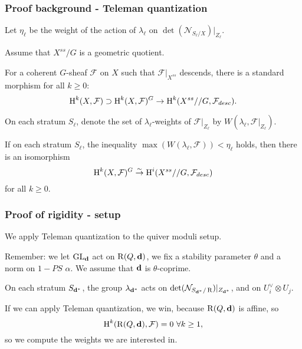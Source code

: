 \documentclass{beamer}
\begin{document}
\begin{frame}
    \frametitle{Proof background - Teleman quantization}
Let $\eta_{\ell}$ be the weight of the action of $\lambda_{\ell}$ on
$\det(\mathcal{N}_{S_{\ell}/X})|_{Z_{\ell}}$. \pause

Assume that $X^{ss}/G$ is a geometric quotient. \pause

For a coherent $G$-sheaf $\mathcal{F}$ on $X$ 
such that $\mathcal{F}|_{X^{ss}}$ descends,
there is a standard morphism for all $k \geq 0$:
\[ \HH^k(X, \mathcal{F}) \supset \HH^{k}(X, \mathcal{F})^{G} \to \HH^{k}(X^{ss} // G, \mathcal{F}_{desc}).\] \pause

On each stratum $S_{\ell}$,
denote the set of $\lambda_{\ell}$-weights of $\mathcal{F}|_{Z_\ell}$
by $W(\lambda_{\ell}, \mathcal{F}|_{Z_\ell})$. \pause
\begin{theorem}

If on each stratum $S_{\ell}$, the inequality $\max(W(\lambda_{\ell}, \mathcal{F})) < \eta_{\ell}$
holds, then there is an isomorphism
\[\HH^{k}(X, \mathcal{F})^{G} \to[\sim] \HH^{i}(X^{ss} // G, \mathcal{F}_{desc})\]
for all $k \geq 0$.
\end{theorem}

\end{frame}

\begin{frame}
    \frametitle{Proof of rigidity - setup}
We apply Teleman quantization to the quiver moduli setup. \pause

Remember: we let $\group$ act on $\parameterspace(Q, \tuple{d})$,
we fix a stability parameter $\theta$ and a norm on $1-PS$ $\alpha$. \pause
We assume that $\tuple{d}$ is $\theta$-coprime.

On each stratum $S_{\tuple{d}^*}$, the group $\lambda_{\tuple{d}^*}$
acts on $\det(\mathcal{N}_{S_{\tuple{d}^*}/\parameterspace})|_{Z_{\tuple{d}^*}}$, \pause
and on ${U}^{\vee}_i \otimes {U}_j$. \pause

If we can apply Teleman quantization, we win, because $\parameterspace(Q, \tuple{d})$ is affine, so
\[\HH^k(\parameterspace(Q, \tuple{d}), \mathcal{F}) = 0 ~\forall k \geq 1,\]
so we compute the weights we are interested in.
\end{frame}
\end{document}
